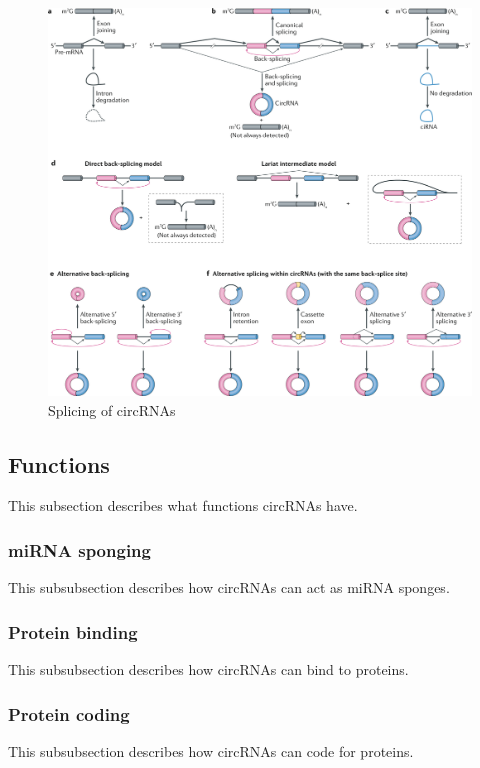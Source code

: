 \begin{figure}[h]
    \centering
    \includegraphics[width=\textwidth]{chapters/background/figures/circRNA-splicing.png}
    \caption{Splicing of circRNAs} %
    \label{fig:circRNA_splicing}
\end{figure}

\subsection{Functions}
This subsection describes what functions circRNAs have.

\subsubsection{miRNA sponging}
This subsubsection describes how circRNAs can act as miRNA sponges.

\subsubsection{Protein binding}
This subsubsection describes how circRNAs can bind to proteins.

\subsubsection{Protein coding}
This subsubsection describes how circRNAs can code for proteins.

